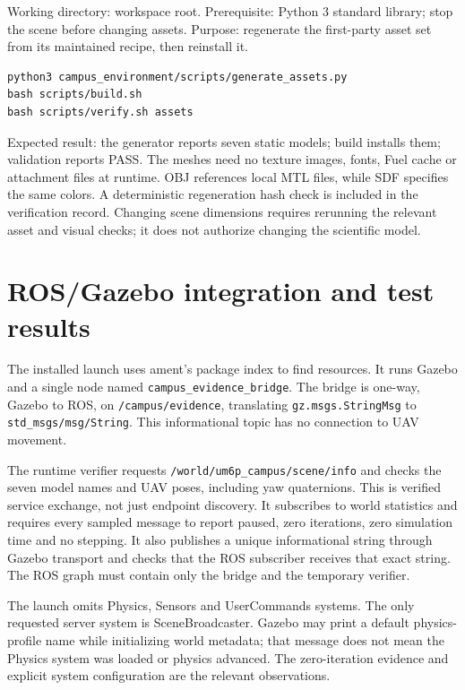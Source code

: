Working directory: workspace root. Prerequisite: Python 3 standard library; stop the scene before changing assets. Purpose: regenerate the first-party asset set from its maintained recipe, then reinstall it.
\begin{lstlisting}
python3 campus_environment/scripts/generate_assets.py
bash scripts/build.sh
bash scripts/verify.sh assets
\end{lstlisting}
Expected result: the generator reports seven static models; build installs them; validation reports PASS. The meshes need no texture images, fonts, Fuel cache or attachment files at runtime. OBJ references local MTL files, while SDF specifies the same colors. A deterministic regeneration hash check is included in the verification record. Changing scene dimensions requires rerunning the relevant asset and visual checks; it does not authorize changing the scientific model.

\section{ROS/Gazebo integration and test results}
The installed launch uses ament's package index to find resources. It runs Gazebo and a single node named \texttt{campus\_evidence\_bridge}. The bridge is one-way, Gazebo to ROS, on \texttt{/campus/evidence}, translating \texttt{gz.msgs.StringMsg} to \texttt{std\_msgs/msg/String}. This informational topic has no connection to UAV movement.

The runtime verifier requests \texttt{/world/um6p\_campus/scene/info} and checks the seven model names and UAV poses, including yaw quaternions. This is verified service exchange, not just endpoint discovery. It subscribes to world statistics and requires every sampled message to report paused, zero iterations, zero simulation time and no stepping. It also publishes a unique informational string through Gazebo transport and checks that the ROS subscriber receives that exact string. The ROS graph must contain only the bridge and the temporary verifier.

The launch omits Physics, Sensors and UserCommands systems. The only requested server system is SceneBroadcaster. Gazebo may print a default physics-profile name while initializing world metadata; that message does not mean the Physics system was loaded or physics advanced. The zero-iteration evidence and explicit system configuration are the relevant observations.

